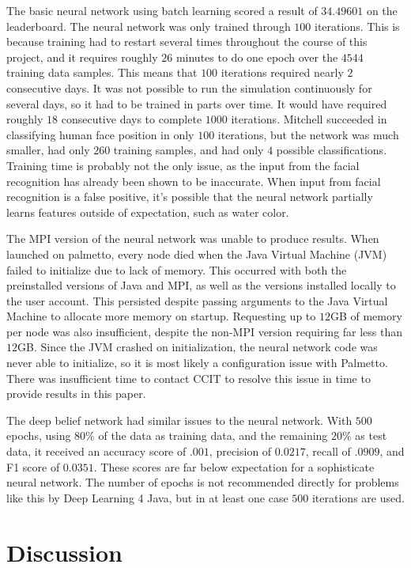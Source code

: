\documentclass[10pt]{IEEEtran}
\newcommand{\?}{\stackrel{?}{=}}
\begin{document}
The basic neural network using batch learning scored a result of $34.49601$ 
on the leaderboard. The neural network was only trained through $100$ iterations. 
This is because training had to restart several times throughout the course of 
this project, and it requires roughly $26$ minutes to do one epoch over the $4544$
training data samples. This means that $100$ iterations required nearly $2$ 
consecutive days. It was not possible to run the simulation continuously for 
several days, so it had to be trained in parts over time. It would have required
 roughly $18$ consecutive days to complete $1000$ iterations. Mitchell succeeded in classifying
 human face position in only $100$ iterations, but the network was much smaller,
 had only $260$ training samples, and had only $4$ possible 
 classifications\cite{mitchell}. Training time is probably not the only issue, as 
 the input from the facial recognition has already been shown to be inaccurate. 
 When input from facial recognition is a false positive, it's possible that the
 neural network partially learns features outside of expectation, such as water
 color.

 The MPI version of the neural network was unable to produce results. When launched
 on palmetto, every node died when the Java Virtual Machine (JVM) failed to initialize
 due to lack of memory. This occurred with both the preinstalled versions of 
 Java and MPI, as well as the versions installed locally to the user account.
 This persisted despite passing arguments to the Java Virtual Machine to 
 allocate more memory on startup. Requesting up to $12$GB of memory per node
 was also insufficient, despite the non-MPI version requiring far less than $12$GB.
 Since the JVM crashed on initialization, the neural network code was never able
 to initialize, so it is most likely a configuration issue with Palmetto. There
 was insufficient time to contact CCIT to resolve this issue in time to provide
 results in this paper. 

The deep belief network had similar issues to the neural network. With $500$
epochs, using $80\%$ of the data as training data, and the remaining $20\%$ as
test data, it received an accuracy score of $.001$, precision of $0.0217$, recall
of $.0909$, and F1 score of $0.0351$. These scores are far below expectation
for a sophisticate neural network. The number of epochs is not recommended directly
for problems like this by Deep Learning 4 Java, but in at least one case $500$
iterations are used\cite{suggestion}. 
\section{Discussion}
\end{document}
